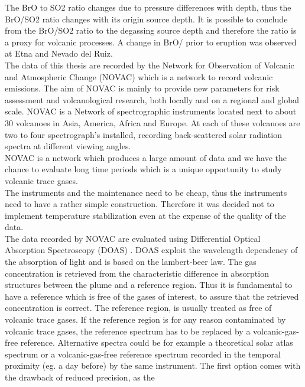 The BrO to SO2 ratio changes due to pressure differences with depth, thus the BrO/SO2 ratio changes with its origin source depth. It is possible to conclude from the BrO/SO2 ratio to the degassing source depth and therefore the ratio is a proxy for volcanic processes. A change in BrO/ prior to eruption was observed at Etna and Nevado del Ruiz.\\
%
\newline
%
The data of this thesis are recorded by the Network for Observation of Volcanic and Atmospheric Change (NOVAC) which is a network to record volcanic emissions. The aim of NOVAC is mainly to provide new parameters for risk assessment and volcanological research, both locally and on a regional and global scale.
NOVAC is a Network of spectrographic instruments located next to about 30 volcanoes in Asia, America, Africa and Europe. At each of these volcanoes are two to four spectrograph's installed, recording back-scattered solar radiation spectra at different viewing angles.\\
NOVAC is a network which produces a large amount of data and we have the chance to evaluate long time periods which is a unique opportunity to study volcanic trace gases.\\
The instruments and the maintenance need to be cheap, thus the instruments need to have a rather simple construction. Therefore it was decided not to implement temperature stabilization even at the expense of the quality of the data.\\
%
\newline
%
The data recorded by NOVAC are evaluated using Differential Optical Absorption Spectroscopy (DOAS) \cite{platt2008differential}. DOAS exploit the wavelength dependency of the absorption of light and is based on the lambert-beer law. The gas concentration is retrieved from the characteristic difference in absorption structures between the plume and a reference region. Thus it is fundamental to have a reference which is free of the gases of interest, to assure that the retrieved concentration is correct.
%
\newline
%
The reference region, is usually treated as free of
volcanic trace gases. If the reference region is for any reason
contaminated by volcanic trace gases, the reference spectrum has to be
replaced by a volcanic-gas-free reference. Alternative spectra could be for example a
theoretical solar atlas spectrum or a volcanic-gas-free reference
spectrum recorded in the temporal proximity (eg. a day before) by the same instrument.
The first option comes with the drawback of reduced precision, as the
